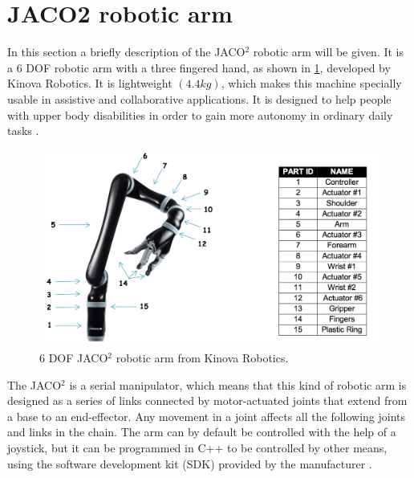 \section{JACO2 robotic arm}

In this section a briefly description of the JACO$^2$ robotic arm will be given. It is a 6 DOF robotic arm  with a three fingered hand, as shown in \ref{fig:roboticarm}, developed by Kinova Robotics. It is lightweight $\left( 4.4 kg\right)$, which makes this machine specially usable in assistive and collaborative applications. It is designed to help people with upper body disabilities in order to gain more autonomy in ordinary daily tasks \cite{kinova2017}.\\

\begin{figure}[H]                    
\includegraphics[width=.7\textwidth]{figures/Jaco/roboticarm}  %
\caption{6 DOF JACO$^2$ robotic arm from Kinova Robotics. \cite{kinova2017}}
\label{fig:roboticarm}  %
\end{figure}

The JACO$^2$ is a serial manipulator, which means that this kind of robotic arm is designed as a series of links connected by motor-actuated joints that extend from a base to an end-effector. Any movement in a joint affects all the following joints and links in the chain. The arm can by default be controlled with the help of a joystick, but it can be programmed in C++ to be controlled by other means, using the software development kit (SDK) provided by the manufacturer \cite{kinova2017}.\\



